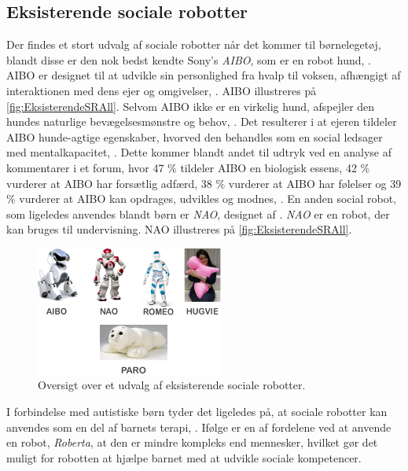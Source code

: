 \subsection{Eksisterende sociale robotter}
\label{EksisterendeSocialeRobotter}
%
Der findes et stort udvalg af sociale robotter når det kommer til børnelegetøj, blandt disse er den nok bedst kendte Sony's \textit{AIBO}, som er en robot hund, \parencite{WEB:AIBO}. AIBO er designet til at udvikle sin personlighed fra hvalp til voksen, afhængigt af interaktionen med dens ejer og omgivelser, \parencite{WEB:AIBO}. AIBO illustreres på \autoref{fig:EksisterendeSRAll}. Selvom AIBO ikke er en virkelig hund, afspejler den hundes naturlige bevægelsesmønstre og behov, \parencite[ss. 191-198]{PDF:AnEthologicalEmotional}. Det resulterer i at ejeren tildeler AIBO hunde-agtige egenskaber, hvorved den behandles som en social ledsager med mentalkapacitet, \parencite[s. 2]{PDF:SharingALifeHarvey}. Dette kommer blandt andet til udtryk ved en analyse af kommentarer i et forum, hvor 47 \% tildeler AIBO en biologisk essens, 42 \% vurderer at AIBO har forsætlig adfærd, 38 \% vurderer at AIBO har følelser og 39 \% vurderer at AIBO kan opdrages, udvikles og modnes, \parencite[s. 26]{PDF:InTheCompanyofRobots}. En anden social robot, som ligeledes anvendes blandt børn er \textit{NAO}, designet af \textcite{WEB:NAO}. \textit{NAO} er en robot, der kan bruges til undervisning. NAO illustreres på \autoref{fig:EksisterendeSRAll}.
%
\begin{figure}[H]
\centering
\includegraphics[width = 0.55\textwidth]{Figure/EksisterendeSRAll} 
\caption{Oversigt over et udvalg af eksisterende sociale robotter.}
\label{fig:EksisterendeSRAll}
\end{figure}
\noindent 
%  
I forbindelse med autistiske børn tyder det ligeledes på, at sociale robotter kan anvendes som en del af barnets terapi, \parencite[s. 180]{PDF:GamesChrildrenAutism}. Ifølge \textcite[s. 185]{PDF:GamesChrildrenAutism} er en af fordelene ved at anvende en robot, \textit{Roberta}, at den er mindre kompleks end mennesker, hvilket gør det muligt for robotten at hjælpe barnet med at udvikle sociale kompetencer.
  
